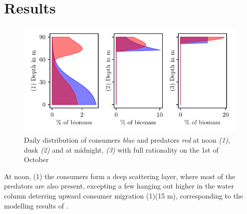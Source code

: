\section{Results}


\begin{figure}[H]
\includegraphics{plots/specific_dists_rational.pdf}
\caption{Daily distribution of consumers \emph{blue} and predators \emph{red} at noon \emph{(1)}, dusk \emph{(2)} and at midnight, \emph{(3)} with full rationality on the 1st of October}
\label{fig:specific_dists_rational}
\end{figure}
At noon, (1) the consumers form a deep scattering layer, where most of the predators are also present, excepting a few hanging out higher in the water column deterring upward consumer migration (1)(15 m), corresponding to the modelling results of \citep{jerome}.

